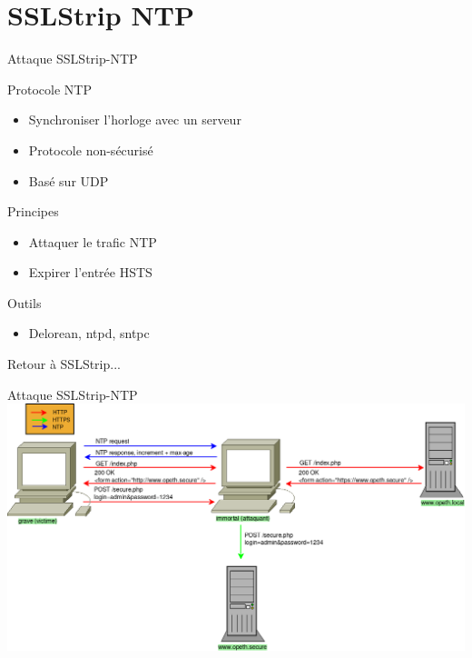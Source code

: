 \section{SSLStrip NTP}

\begin{frame}{Attaque SSLStrip-NTP}

  \begin{block}{Protocole NTP}
    \begin{itemize}
    \item{Synchroniser l'horloge avec un serveur}
    \item{Protocole non-sécurisé}
    \item{Basé sur UDP}
    \end{itemize}
  \end{block}

  \begin{block}{Principes}
    \begin{itemize}
    \item{Attaquer le trafic NTP}
    \item{Expirer l'entrée HSTS}
    \end{itemize}
  \end{block}

  \begin{exampleblock}{Outils}
    \begin{itemize}
    \item{Delorean, ntpd, sntpc}
    \end{itemize}
  \end{exampleblock}

  {\Large \centerline{Retour à SSLStrip...}}
\end{frame}

\begin{frame}{Attaque SSLStrip-NTP}
    \includegraphics[width=\linewidth]{../medias/sslstrip-ntp/attack.png}
\end{frame}
